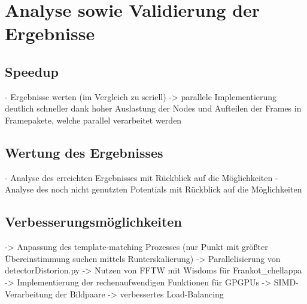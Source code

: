 \chapter{Analyse sowie Validierung der Ergebnisse}

\section{Speedup}

\begin{correctmore}
	- Ergebnisse werten (im Vergleich zu seriell)
	-> parallele Implementierung deutlich schneller dank hoher Auslastung der Nodes und Aufteilen der Frames in Framepakete, welche parallel verarbeitet werden
\end{correctmore}
\section{Wertung des Ergebnisses}

\begin{correctmore}
	- Analyse des erreichten Ergebnisses mit Rückblick auf die Möglichkeiten
	- Analyse des noch nicht genutzten Potentials mit Rückblick auf die Möglichkeiten
\end{correctmore}

\section{Verbesserungsmöglichkeiten}

\begin{correctmore}
	-> Anpassung des template-matching Prozesses (nur Punkt mit größter Übereinstimmung suchen mittels Runterskalierung)
	-> Parallelisierung von detectorDistorion.py
	-> Nutzen von FFTW mit Wisdoms für Frankot\_chellappa
	-> Implementierung der rechenaufwendigen Funktionen für GPGPUs
	-> SIMD-Verarbeitung der Bildpaare
	-> verbessertes Load-Balancing
\end{correctmore}